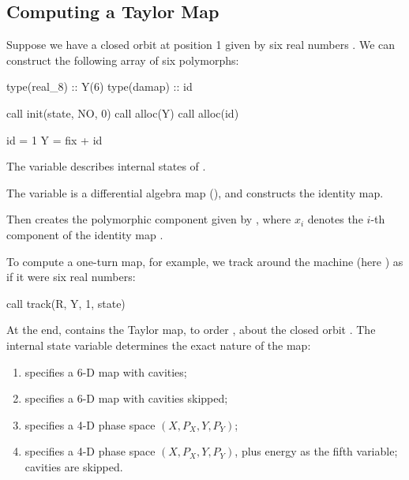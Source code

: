 \subsection{Computing a Taylor Map}

%
Suppose we have a closed orbit at position 1 given by six real numbers . We can construct the following array of six polymorphs:

\begin{ptccode}
type(real_8) :: Y(6)
type(damap) :: id

call init(state, NO, 0)
call alloc(Y)
call alloc(id)

id = 1
Y = fix + id
\end{ptccode}

The variable  describes internal states of \PTC.

The variable  is a differential algebra map (), and  constructs the identity map.

Then  creates the polymorphic component  given by , where $x_i$ denotes the $i$-th component of the identity map .

%
To compute a one-turn map, for example, we track  around the
machine (here ) as if it were six real numbers:

\begin{ptccode}
call track(R, Y, 1, state)
\end{ptccode}

%
At the end,  contains the Taylor map, to order , about the closed orbit . The internal state variable  determines the exact nature of the map:
\begin{enumerate}
  \item {} specifies a 6-D map with cavities;
  \item {} specifies a 6-D map with cavities skipped;
  \item {} specifies a 4-D phase space $(X, P_X, Y, P_Y)$;
  \item {} specifies a 4-D phase
space $(X, P_X, Y, P_Y)$, plus energy as the fifth variable; cavities are skipped.
\end{enumerate}

